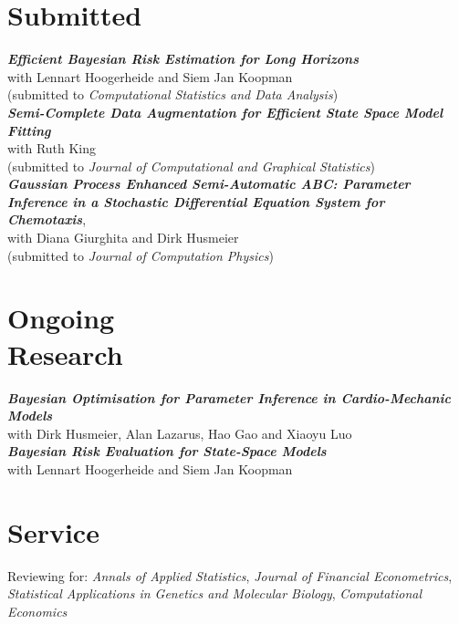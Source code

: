 \documentclass[margin,line]{resume}
\begin{document}
\begin{resume}
%
	\pagebreak
\section{\mysidestyle Submitted}	
\textit{\textbf{Efficient Bayesian Risk Estimation for Long Horizons}}\\
	with Lennart Hoogerheide and Siem Jan Koopman\\
	(submitted to \textit{Computational Statistics and Data Analysis})\vspace{2 mm} \\ 
\textit{\textbf{Semi-Complete Data Augmentation for Efficient State Space Model Fitting}}\\ 
    with Ruth King \\
    (submitted to \textit{Journal of Computational and Graphical Statistics})\vspace{2mm} \\   
\textit{\textbf{Gaussian Process Enhanced Semi-Automatic ABC: Parameter Inference in a Stochastic Differential Equation System for Chemotaxis}},\\ 
    with Diana Giurghita and Dirk Husmeier \\
     (submitted to \textit{Journal of Computation Physics}) \\   

\vspace{-5mm}    		 	
\section{\mysidestyle Ongoing \\Research } 
   	\textit{\textbf{Bayesian Optimisation for Parameter Inference in Cardio-Mechanic Models}}\\ 
    with Dirk Husmeier, Alan Lazarus, Hao Gao and Xiaoyu Luo \vspace{2mm} \\   	
   	\textit{\textbf{Bayesian Risk Evaluation for State-Space Models}}\\ 
    with Lennart Hoogerheide and Siem Jan Koopman  \\  
      
\vspace{-5mm}
 \section{\mysidestyle Service}
Reviewing for: \textit{Annals of Applied Statistics}, \textit{Journal of Financial Econometrics}, \textit{Statistical Applications in Genetics and Molecular Biology},  \textit{Computational Economics}



\end{resume}
\end{document}
